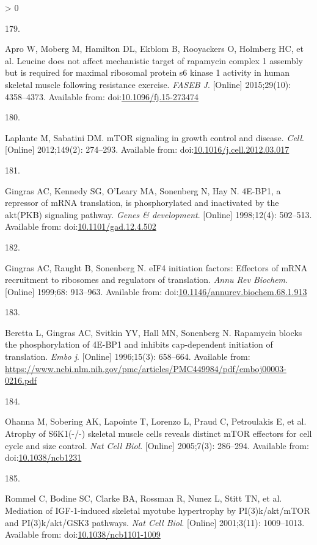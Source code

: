\documentclass[twoside,10pt]{gihclass} %
\newlength{\cslhangindent}
\newlength{\csllabelwidth}
\newenvironment{CSLReferences}[3] %
 {%
  \setlength{\parindent}{0pt}
  \ifodd #1 \everypar{\setlength{\hangindent}{\cslhangindent}}\ignorespaces\fi
  \ifnum #2 > 0
  \setlength{\parskip}{#2\baselineskip}
  \fi
 }%
 {}
\newcommand{\CSLLeftMargin}[1]{\parbox[t]{\maxof{\widthof{#1}}{\csllabelwidth}}{#1}}
\newcommand{\CSLRightInline}[1]{\parbox[t]{\linewidth}{#1}}
\begin{document}
\begin{CSLReferences}{0}{0}
\leavevmode\hypertarget{ref-RN1641}{}%
\CSLLeftMargin{179. }
\CSLRightInline{Apro W, Moberg M, Hamilton DL, Ekblom B, Rooyackers O, Holmberg HC, et al. Leucine does not affect mechanistic target of rapamycin complex 1 assembly but is required for maximal ribosomal protein s6 kinase 1 activity in human skeletal muscle following resistance exercise. \emph{FASEB J}. {[}Online{]} 2015;29(10): 4358--4373. Available from: doi:\href{https://doi.org/10.1096/fj.15-273474}{10.1096/fj.15-273474}}

\leavevmode\hypertarget{ref-RN2139}{}%
\CSLLeftMargin{180. }
\CSLRightInline{Laplante M, Sabatini DM. mTOR signaling in growth control and disease. \emph{Cell}. {[}Online{]} 2012;149(2): 274--293. Available from: doi:\href{https://doi.org/10.1016/j.cell.2012.03.017}{10.1016/j.cell.2012.03.017}}

\leavevmode\hypertarget{ref-RN2837}{}%
\CSLLeftMargin{181. }
\CSLRightInline{Gingras AC, Kennedy SG, O'Leary MA, Sonenberg N, Hay N. 4E-BP1, a repressor of mRNA translation, is phosphorylated and inactivated by the akt(PKB) signaling pathway. \emph{Genes \& development}. {[}Online{]} 1998;12(4): 502--513. Available from: doi:\href{https://doi.org/10.1101/gad.12.4.502}{10.1101/gad.12.4.502}}

\leavevmode\hypertarget{ref-RN2838}{}%
\CSLLeftMargin{182. }
\CSLRightInline{Gingras AC, Raught B, Sonenberg N. eIF4 initiation factors: Effectors of mRNA recruitment to ribosomes and regulators of translation. \emph{Annu Rev Biochem}. {[}Online{]} 1999;68: 913--963. Available from: doi:\href{https://doi.org/10.1146/annurev.biochem.68.1.913}{10.1146/annurev.biochem.68.1.913}}

\leavevmode\hypertarget{ref-RN2840}{}%
\CSLLeftMargin{183. }
\CSLRightInline{Beretta L, Gingras AC, Svitkin YV, Hall MN, Sonenberg N. Rapamycin blocks the phosphorylation of 4E-BP1 and inhibits cap-dependent initiation of translation. \emph{Embo j}. {[}Online{]} 1996;15(3): 658--664. Available from: \url{https://www.ncbi.nlm.nih.gov/pmc/articles/PMC449984/pdf/emboj00003-0216.pdf}}

\leavevmode\hypertarget{ref-RN2828}{}%
\CSLLeftMargin{184. }
\CSLRightInline{Ohanna M, Sobering AK, Lapointe T, Lorenzo L, Praud C, Petroulakis E, et al. Atrophy of S6K1(-/-) skeletal muscle cells reveals distinct mTOR effectors for cell cycle and size control. \emph{Nat Cell Biol}. {[}Online{]} 2005;7(3): 286--294. Available from: doi:\href{https://doi.org/10.1038/ncb1231}{10.1038/ncb1231}}

\leavevmode\hypertarget{ref-RN783}{}%
\CSLLeftMargin{185. }
\CSLRightInline{Rommel C, Bodine SC, Clarke BA, Rossman R, Nunez L, Stitt TN, et al. Mediation of IGF-1-induced skeletal myotube hypertrophy by PI(3)k/akt/mTOR and PI(3)k/akt/GSK3 pathways. \emph{Nat Cell Biol}. {[}Online{]} 2001;3(11): 1009--1013. Available from: doi:\href{https://doi.org/10.1038/ncb1101-1009}{10.1038/ncb1101-1009}}


\end{CSLReferences}
\end{document}
